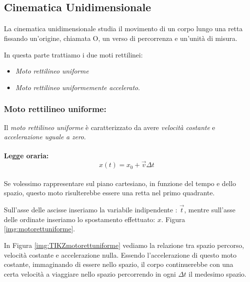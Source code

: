\subsection{Cinematica Unidimensionale}

\paragraph{}
La cinematica unidimensionale studia il movimento di un corpo lungo una retta fissando un'origine, chiamata O, un verso di percorrenza e un'unità di misura.

In questa parte trattiamo i due moti rettilinei:
\begin{itemize}
    \item \textit{Moto rettilineo uniforme}
    \item \textit{Moto rettilineo uniformemente accelerato}.
\end{itemize}

\paragraph{}
\subsubsection{Moto rettilineo uniforme:}
Il \textit{moto rettilineo uniforme} è caratterizzato da avere \textit{velocità costante} e \textit{accelerazione uguale a zero}.
\paragraph{}
\textbf{Legge oraria:}
\begin{equation}
    x(t) = x_0 + \vec{v}\Delta t
    \label{leggeOrariamrUnivrome}
\end{equation}

\paragraph{}
Se volessimo rappresentare sul piano cartesiano, in funzione del tempo e dello spazio, questo moto risulterebbe essere una retta nel primo quadrante.

Sull'asse delle ascisse inseriamo la variabile indipendente : $\vec{t}$, mentre sull'asse delle ordinate inseriamo lo spostamento effettuato: $x$. Figura \ref{img:motorettuniforme}.

In Figura \ref{img:TIKZmotorettuniforme} vediamo la relazione tra spazio percorso, velocità costante e accelerazione nulla. Essendo l'accelerazione di questo moto costante, immaginando di essere nello spazio, il corpo continuerebbe con una certa velocità a viaggiare nello spazio percorrendo in ogni $\Delta t$ il medesimo spazio.  
